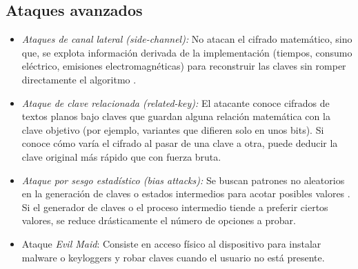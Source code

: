 \subsection{Ataques avanzados}

\begin{itemize}
  \item \emph{Ataques de canal lateral (side-channel):} No atacan el cifrado matemático, sino que, se explota información derivada de la implementación (tiempos, consumo eléctrico, emisiones electromagnéticas) para reconstruir las claves sin romper directamente el algoritmo \cite{cryptanalysis_and_types_of_attacks}.
  \item \emph{Ataque de clave relacionada (related-key):} El atacante conoce cifrados de textos planos bajo claves que guardan alguna relación matemática con la clave objetivo (por ejemplo, variantes que difieren solo en unos bits). Si conoce cómo varía el cifrado al pasar de una clave a otra, puede deducir la clave original más rápido que con fuerza bruta.
  \item \emph{Ataque por sesgo estadístico (bias attacks):} Se buscan patrones no aleatorios en la generación de claves o estados intermedios para acotar posibles valores \cite{modern_cryptographic_attacks_guide_for_perplexed}. Si el generador de claves o el proceso intermedio tiende a preferir ciertos valores, se reduce drásticamente el número de opciones a probar.
  \item Ataque \emph{Evil Maid}: Consiste en acceso físico al dispositivo para instalar malware o keyloggers y robar claves cuando el usuario no está presente.
\end{itemize}